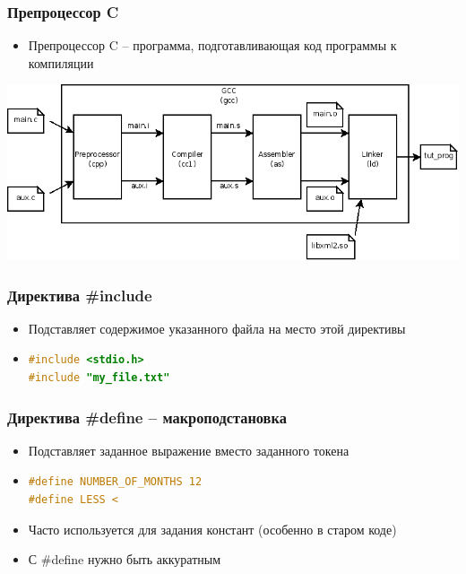 \documentclass[14pt,pdf,hyperref={unicode}]{beamer}
\begin{document}
\begin{frame}[fragile]
\frametitle{Препроцессор C} 
\begin{itemize}
\item Препроцессор C -- программа, подготавливающая код программы к компиляции
\end{itemize}
\begin{center}
\includegraphics[width=0.95\linewidth]{images/compilation-stages.png}
\end{center}
\end{frame}


\begin{frame}[fragile]
\frametitle{Директива \#include} 
\begin{itemize}
\item Подставляет содержимое указанного файла на место этой директивы
\item \begin{lstlisting}[language=C,basicstyle=\ttfamily,keywordstyle=\color{blue}]
#include <stdio.h>
#include "my_file.txt"
\end{lstlisting}
\end{itemize}
\end{frame}

\begin{frame}[fragile]
\frametitle{Директива \#define -- макроподстановка} 
\begin{itemize}
\item Подставляет заданное выражение вместо заданного токена
\item \begin{lstlisting}[language=C,basicstyle=\ttfamily,keywordstyle=\color{blue}]
#define NUMBER_OF_MONTHS 12
#define LESS <
\end{lstlisting}
\item Часто используется для задания констант (особенно в старом коде)
\item С \#define нужно быть аккуратным
\end{itemize}
\end{frame}
\end{document}
